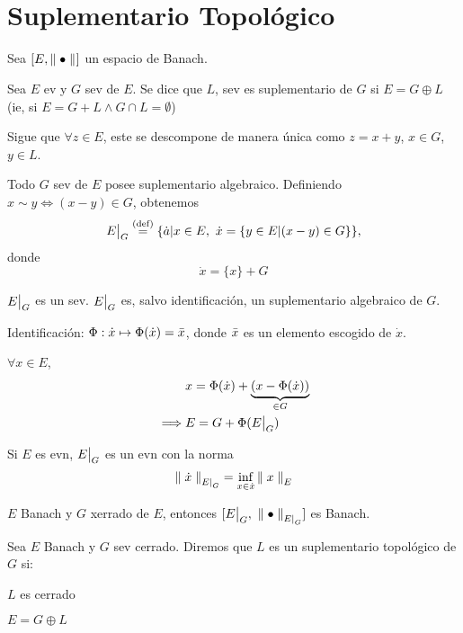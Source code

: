 
\renewcommand{\catnum}{6 (4 No Presencial)}%
\renewcommand{\fecha}{6 de abril de 2020}


\section{Suplementario Topológico}

Sea $[E, \norm[]{\bullet}]$ un espacio de Banach.

\begin{defn}
Sea $E$ ev y $G$ sev de $E$. Se dice que $L$, sev es suplementario de $G$ si $E = G \oplus L$ (ie, si $E = G + L \wedge G \cap L = \emptyset$)
\end{defn}

Sigue que $\forall z \in E$, este se descompone de manera única como $z = x + y$, $x \in G$, $y \in L$.

Todo $G$ sev de $E$ posee suplementario algebraico. Definiendo $x \sim y \iff (x - y) \in G$, obtenemos $$
\restr{E}{G} \defeq \{ \dot{a} | x \in E,\ \dot{x} = \{ y \in E | (x - y )\in G \}  \},
$$ donde $$
\dot{x} = \{ x \} + G
$$

$\restr{E}{G}$ es un sev. $\restr{E}{G}$ es, salvo identificación, un suplementario algebraico de $G$.

Identificación: $\Phi: \dot{x} \mapsto \Phi ( \dot{x} ) = \Bar{x}$, donde $\Bar{x}$ es un elemento escogido de $\dot{x}$.

$\forall x \in E$,
\begin{align*}
&x = \Phi (\dot{x}) + \underbrace{(x - \Phi (\dot{x}))}_{\in G}\\
\implies & E = G + \Phi ( \restr{E}{G} )
\end{align*}

Si $E$ es evn, $\restr{E}{G}$ es un evn con la norma $$
\norm[{E |}_{G}]{\dot{x}} = \inf_{x \in \dot{x}} \norm[E]{x}
$$ 

\begin{exer}
$E$ Banach y $G$ xerrado de $E$, entonces $[\restr{E}{G},\ \norm[{E|}_{G}]{\bullet}]$ es Banach.
\end{exer}

\begin{defn}
Sea $E$ Banach y $G$ sev cerrado. Diremos que $L$ es un suplementario topológico de $G$ si:
\begin{ienumerate}
    \item $L$ es cerrado
    \item $E = G\oplus L$
\end{ienumerate}
\end{defn}

